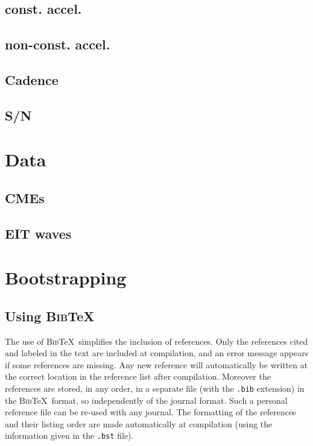 \documentclass[namedreferences]{SolarPhysics}
\newcommand{\BibTeX}{\textsc{Bib}\TeX}
\begin{document}
\begin{article}
\subsection{const. accel.}

\subsection{non-const. accel.}

\subsection{ Cadence}

\subsection{S/N}

\section{Data}

\subsection{CMEs}

\subsection{EIT waves}

\section{Bootstrapping}

      
\subsection{Using \BibTeX} %
  \label{S-BibTeX}
  The use of \BibTeX\ simplifies the inclusion of references. Only the 
references cited and labeled in the text are included at compilation, 
and an error message appears if some references
are missing.  Any new reference will automatically be written at the correct 
location in the reference list after compilation. 
Moreover the references are stored, in any order, in a separate file
(with the \texttt{.bib} extension) in the \BibTeX\ format, so independently of 
the journal format. Such a personal reference file can be re-used with any journal.
The formatting of the references and their listing order are made automatically
at compilation (using the information given in the \texttt{.bst} file). 
        

\end{article}
\end{document}
